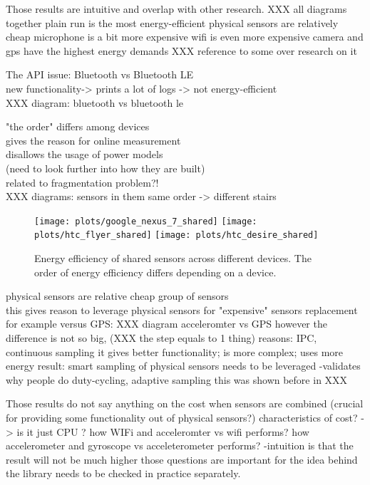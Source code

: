 Those results are intuitive and overlap with other research.
	XXX all diagrams together
	plain run is the most energy-efficient
	physical sensors are relatively cheap
	microphone is a bit more expensive 
	wifi is even more expensive
	camera and gps have the highest energy demands
	XXX reference to some over research on it
	

The API issue: Bluetooth vs Bluetooth LE\\
	new functionality-> prints a lot of logs -> not energy-efficient\\
	XXX diagram: bluetooth vs bluetooth le 
	
				
"the order" differs among devices\\
	gives the reason for online measurement\\
	disallows the usage of power models\\
		(need to look further into how they are built)\\
		related to fragmentation problem?!\\
	XXX diagrams: sensors in them same order -> different stairs
	
\begin{figure}[H]
\centering
\texttt{[image: plots/google\_nexus\_7\_shared]}
\texttt{[image: plots/htc\_flyer\_shared]}
\texttt{[image: plots/htc\_desire\_shared]}
\caption{\label{p:shared_sensors_results} Energy efficiency of shared sensors across different devices. The order of energy efficiency differs depending on a device. }
\end{figure}

physical sensors are relative cheap group of sensors \\
	this gives reason to leverage physical sensors for "expensive" sensors replacement
		for example versus GPS:
			XXX diagram acceleromter vs GPS
	however the difference is not so big, 
		(XXX the step equals to 1 thing)
		reasons: IPC, continuous sampling
			it gives better functionality; is more complex; uses more energy
		result: smart sampling of physical sensors needs to be leveraged
			-validates why people do duty-cycling, adaptive sampling
		this was shown before in XXX
	

Those results do not say anything on the cost when sensors are combined
		(crucial for providing some functionality out of physical sensors?)
		characteristics of cost? -> is it just CPU ?
			how WIFi and acceleromter vs wifi performs?
			how accelerometer and gyroscope vs acceleterometer performs?
				-intuition is that the result will not be much higher
			those questions are important for the idea behind  the library
				needs to be checked in practice separately.
		
